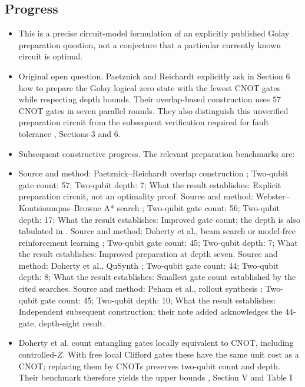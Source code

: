 \subsection*{Progress}

\begin{itemize}
  \item This is a precise circuit-model formulation of an explicitly published Golay preparation question, not a conjecture that a particular currently known circuit is optimal.

  \item Original open question. Paetznick and Reichardt explicitly ask in Section 6 how to prepare the Golay logical zero state with the fewest CNOT gates while respecting depth bounds. Their overlap-based construction uses $57$ CNOT gates in seven parallel rounds. They also distinguish this unverified preparation circuit from the subsequent verification required for fault tolerance , Sections 3 and 6.

  \item Subsequent constructive progress. The relevant preparation benchmarks are:

  \item Source and method: Paetznick–Reichardt overlap construction ; Two-qubit gate count: 57; Two-qubit depth: 7; What the result establishes: Explicit preparation circuit, not an optimality proof.
Source and method: Webster–Koutsioumpas–Browne A* search ; Two-qubit gate count: 56; Two-qubit depth: 17; What the result establishes: Improved gate count; the depth is also tabulated in .
Source and method: Doherty et al., beam search or model-free reinforcement learning ; Two-qubit gate count: 45; Two-qubit depth: 7; What the result establishes: Improved preparation at depth seven.
Source and method: Doherty et al., QuSynth ; Two-qubit gate count: 44; Two-qubit depth: 8; What the result establishes: Smallest gate count established by the cited searches.
Source and method: Peham et al., rollout synthesis ; Two-qubit gate count: 45; Two-qubit depth: 10; What the result establishes: Independent subsequent construction; their note added acknowledges the $44$-gate, depth-eight result.

  \item Doherty et al. count entangling gates locally equivalent to CNOT, including controlled-$Z$. With free local Clifford gates these have the same unit cost as a CNOT; replacing them by CNOTs preserves two-qubit count and depth. Their benchmark therefore yields the upper bounds , Section V and Table I


\end{itemize}
